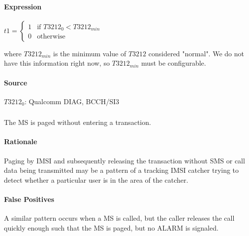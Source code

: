 \documentclass[a4paper,11pt,notitlepage,bigheadings,oneside]{scrartcl}
\begin{document}
\paragraph{Expression}

$t1 =
\begin{cases}
	1 	& \text{if } T3212_0 < T3212_{min} \\
	0       & \text{otherwise}
\end{cases}$

where $T3212_{min}$ is the minimum value of $T3212$ considered "normal". We do
not have this information right now, so $T3212_{min}$ must be configurable.

\paragraph{Source}

$T3212_0$: Qualcomm DIAG, BCCH/SI3




\subsubsection{}

The MS is paged without entering a transaction.

\paragraph{Rationale}

Paging by IMSI and subsequently releasing the transaction without SMS or call
data being transmitted may be a pattern of a tracking IMSI catcher trying to
detect whether a particular user is in the area of the catcher.

\paragraph{False Positives}

A similar pattern occurs when a MS is called, but the caller releases the call
quickly enough such that the MS is paged, but no ALARM is signaled.
\end{document}
